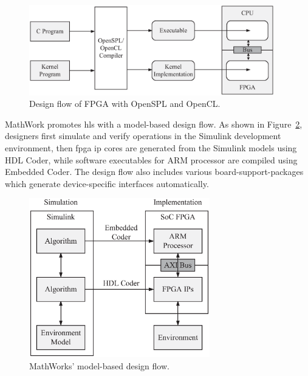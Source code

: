 \begin{figure}[ht]
\begin{center}
\includegraphics[width=0.95\textwidth]{2_background/figures/openspl}
\end{center}
\caption{Design flow of FPGA with OpenSPL and OpenCL.}
\label{fig:openspl}
\end{figure}

MathWork promotes \gls{hls} with a model-based design flow.
As shown in Figure~\ref{fig:hdlcoder}, designers first simulate and verify operations in the Simulink development environment, then \gls{fpga} \gls{ip} cores are generated from the Simulink models using HDL Coder, while software executables for ARM processor are compiled using Embedded Coder.
The design flow also includes various board-support-packages which generate device-specific interfaces automatically.

\begin{figure}[ht]
\begin{center}
\includegraphics[width=0.7\textwidth]{2_background/figures/hdlcoder}
\end{center}
\caption{MathWorks' model-based design flow.}
\label{fig:hdlcoder}
\end{figure}

